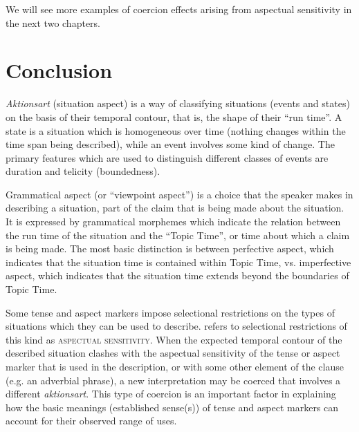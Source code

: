 We will see more examples of coercion effects arising from aspectual sensitivity in the next two chapters.


\section{Conclusion}\label{sec:20.7}

\textit{Aktionsart} (situation aspect) is a way of classifying situations (events and states) on the basis of their temporal contour, that is, the shape of their “run time”. A state is a situation which is homogeneous over time (nothing changes within the time span being described), while an event involves some kind of change. The primary features which are used to distinguish different classes of events are duration and telicity (boundedness).



Grammatical aspect (or “viewpoint aspect”) is a choice that the speaker makes in describing a situation, part of the claim that is being made about the situation. It is expressed by grammatical morphemes which indicate the relation between the run time of the situation and the “Topic Time”, or time about which a claim is being made. The most basic distinction is between perfective aspect, which indicates that the situation time is contained within Topic Time, vs. imperfective aspect, which indicates that the situation time extends beyond the boundaries of Topic Time.



Some tense and aspect markers impose selectional restrictions on the types of situations which they can be used to describe.  refers to selectional restrictions of this kind as \textsc{aspectual sensitivity}. When the expected temporal contour of the described situation clashes with the aspectual sensitivity of the tense or aspect marker that is used in the description, or with some other element of the clause (e.g. an adverbial phrase), a new interpretation may be coerced that involves a different \textit{aktionsart}. This type of coercion is an important factor in explaining how the basic meanings (established sense(s)) of tense and aspect markers can account for their observed range of uses.



